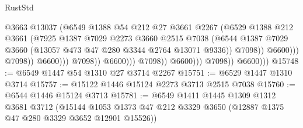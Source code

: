 \begin{lexlean}{RustStd}
\begin{coremodule}
                                                @3663
                                                @13037
                                                (@6549
                                                  @1388
                                                  @54
                                                  @212
                                                  @27
                                                  @3661
                                                  @2267
                                                  (@6529
                                                    @1388
                                                    @212
                                                    @3661
                                                    (@7925
                                                      @1387
                                                      @7029
                                                      @2273
                                                      @3660
                                                      @2515
                                                      @7038
                                                      (@6544
                                                        @1387
                                                        @7029
                                                        @3660
                                                        (@13057
                                                          @473
                                                          @47
                                                          @280
                                                          @3344
                                                          @2764
                                                          @13071
                                                          @9336))
                                                      @7098))
                                                  @6600)))
                                            @7098))
                                        @6600)))
                                  @7098))
                              @6600)))
                        @7098))
                    @6600)))
              @7098))
          @6600)))
@15748 := @6549 @1447 @54 @1310 @27 @3714 @2267
@15751 := @6529 @1447 @1310 @3714
@15757 := @15122 @1446 @15124 @2273 @3713 @2515 @7038
@15760 := @6544 @1446 @15124 @3713
@15781 := @6549
    @1411
    @1445
    @1309
    @1312
    @3681
    @3712
    (@15144 @1053 @1373 @47 @212 @3329 @3650 (@12887 @1375 @47 @280 @3329 @3652 @12901 @15526))

\end{coremodule}
\end{lexlean}
